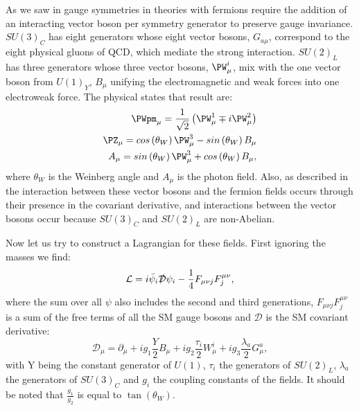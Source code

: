 As we saw in  gauge symmetries in theories with fermions require the addition of an interacting vector boson per symmetry generator to preserve gauge invariance. $SU\left(3\right)_{C}$ has eight generators whose eight vector bosons, $G_{a\mu}$, correspond to the eight physical gluons of \ac{QCD}, which mediate the strong interaction. $SU\left(2\right)_{L}$ has three generators whose three vector bosons, $\PW^{i}_{\mu}$, mix with the one vector boson from $U\left(1\right)_{Y}$, $B_{\mu}$ unifying the electromagnetic and weak forces into one electroweak force. The physical states that result are:
\begin{equation}
  \begin{split}
  \PWpm_{\mu}=\frac{1}{\sqrt{2}}\left(\PW^{1}_{\mu}\mp i\PW^{2}_{\mu}\right) \\
  \PZ_{\mu}=cos\left(\theta_{W}\right)\PW^{3}_{\mu}-sin\left(\theta_{W}\right)B_{\mu} \\
  A_{\mu}=sin\left(\theta_{W}\right)\PW^{3}_{\mu}+cos\left(\theta_{W}\right)B_{\mu},
  \end{split}
\end{equation}
where $\theta_{W}$ is the Weinberg angle and $A_{\mu}$ is the photon field. Also, as described in  the interaction between these vector bosons and the fermion fields occurs through their presence in the covariant derivative, and interactions between the vector bosons occur because $SU\left(3\right)_{C}$ and $SU\left(2\right)_{L}$ are non-Abelian.

Now let us try to construct a Lagrangian for these fields. First ignoring the masses we find:
\begin{equation}
  \mathcal{L}=i\bar{\psi}_{i}\slashed{\mathcal{D}}\psi_{i}-\frac{1}{4}F_{\mu\nu j}F^{\mu\nu}_{j},
\end{equation}
where the sum over all $\psi$ also includes the second and third generations, $F_{\mu\nu j}F^{\mu\nu}_{j}$ is a sum of the free terms of all the SM gauge bosons and $\mathcal{D}$ is the SM covariant derivative:
\begin{equation}
  \mathcal{D_{\mu}}=\partial_{\mu}+ig_{1}\frac{Y}{2}B_{\mu}+ig_{2}\frac{\tau_{i}}{2}W_{\mu}^{i}+ig_{3}\frac{\lambda_{a}}{2}G_{\mu}^{a},
\end{equation}
with Y being the constant generator of $U\left(1\right)$, $\tau_{i}$ the generators of $SU\left(2\right)_{L}$, $\lambda_{a}$ the generators of $SU\left(3\right)_{C}$ and $g_{i}$ the coupling constants of the fields. It should be noted that $\frac{g_{1}}{g_{2}}$ is equal to $\tan\left(\theta_{W}\right)$.


